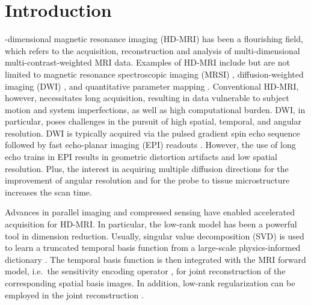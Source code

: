 \documentclass[journal,twoside,web]{ieeecolor}
\begin{document}
	\section{Introduction}
	\label{SEC:INTRO}
	-dimensional magnetic resonance imaging (HD-MRI)
	has been a flourishing field,
	which refers to the acquisition, reconstruction and analysis of
	multi-dimensional multi-contrast-weighted MRI data.
	Examples of HD-MRI include but are not limited to
	magnetic resonance spectroscopic imaging (MRSI)
	\cite{brown_1982_mrsi},
	diffusion-weighted imaging (DWI)
	\cite{lebihan_1986_diff,merboldt_1985_diff},
	and quantitative parameter mapping
	\cite{doneva_2010_moba,ma_2013_mrf}.
	Conventional HD-MRI, however, necessitates long acquisition,
	resulting in data vulnerable to subject motion
	and system imperfections, as well as high computational burden.
	DWI, in particular, poses challenges in the pursuit of
	high spatial, temporal, and angular resolution.
	DWI is typically acquired via
	the pulsed gradient spin echo sequence \cite{stejskal_1965_pgse}
	followed by fast echo-planar imaging (EPI) readouts
	\cite{mansfield_1977_epi}.
	However, the use of long echo trains in EPI results in
	geometric distortion artifacts and low spatial resolution.
	Plus, the interest in acquiring multiple diffusion directions
	for the improvement of angular resolution and
	for the probe to tissue microstructure increases the scan time.

	Advances in parallel imaging
	\cite{roemer_1990_pi,sodickson_1997_smash,
	pruessmann_1999_sense,pruessmann_2001_gsense,griswold_2002_grappa}
	and compressed sensing
	\cite{lustig_2007_cs,block_2007_cs,liang_2007_psf}
	have enabled accelerated acquisition for HD-MRI.
	In particular, the low-rank model \cite{cai_2010_svt}
	has been a powerful tool in dimension reduction.
	Usually, singular value decomposition (SVD) is used to
	learn a truncated temporal basis function from
	a large-scale physics-informed dictionary
	\cite{huang_2012_t2basis,lam_2014_spice,mcgivney_2014_svdmrf}.
	The temporal basis function is then integrated
	with the MRI forward model,
	i.e.~the sensitivity encoding operator \cite{pruessmann_2001_gsense},
	for joint reconstruction of the corresponding spatial basis images.
	In addition, low-rank regularization can be employed
	in the joint reconstruction \cite{tamir_2017_t2shuffling}.
\end{document}
